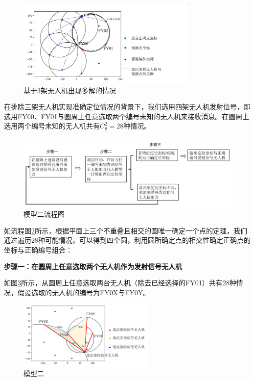\documentclass{my_paper}
\begin{document}
\begin{figure}[h]
    \centering
    \includegraphics[width=0.8\textwidth]{sandian.jpg}
    \caption{基于3架无人机出现多解的情况}
    \label{sandian}
\end{figure}

在排除三架无人机实现准确定位情况的背景下，我们选用四架无人机发射信号，即选用FY00、FY01与圆周上任意选取两个编号未知的无人机来接收消息。在圆周上选用两个编号未知的无人机共有$C_{8}^{2}=28$种情况。

\begin{figure}[h]
    \centering
    \includegraphics[width=1\textwidth]{wenti2liucheng.jpg}
    \caption{模型二流程图}
    \label{moxing2liucheng}
\end{figure}

如流程图\ref{moxing2liucheng}所示，根据平面上三个不重叠且相交的圆唯一确定一个点的定理，我们通过遍历28种可能情况，可以得到四个圆，利用圆所确定点的相交性确定正确点的坐标与正确编号组合：

\textbf{步骤一：在圆周上任意选取两个无人机作为发射信号无人机}

如图\ref{moxing2}所示，从圆周上任意选取两台无人机（除去已经选择的FY01）共有28种情况，假设选取的无人机的编号为FY0X与FY0Y。

\begin{figure}[h]
    \centering
    \includegraphics[width=0.6\textwidth]{wenti2.jpg}
    \caption{模型二}
    \label{moxing2}
\end{figure}
\end{document}

